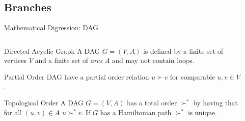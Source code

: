 \documentclass[xetex, handout]{beamer}
\begin{document}
\subsection{Branches}

\begin{frame}[fragile]{Mathematical Digression: DAG}
  \begin{columns}
    \begin{column}{.55\linewidth}
      \begin{block}{Directed Acyclic Graph}
        A DAG $G = (V,A)$ is defined by a finite set of vertices $V$ and a
        finite set of \emph{arcs} $A$ and may not contain loops.
      \end{block}

      \begin{block}{Partial Order}
        DAG have a partial order relation $u \succ v$ for comparable $u,v \in V$.
      \end{block}

      \begin{alertblock}{Topological Order}
        A DAG $G = (V,A)$ has a total order $\succ^*$ by having that for all
        $(u, v) \in A$ $u \succ^* v$. If $G$ has a Hamiltonian path
        $\succ^*$
        is unique.
      \end{alertblock}
    \end{column}
    \begin{column}{.45\linewidth}
\end{column}
\end{columns}
\end{frame}
\end{document}

